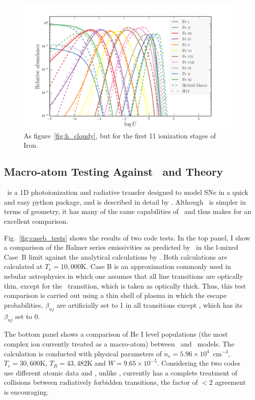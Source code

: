 \begin{figure}
\centering
\includegraphics[width=1.0\textwidth]{figures/03-radtrans/ir_comp.png}
\caption
{
As figure~\ref{fig:h_cloudy}, but for the first 11 ionization stages of Iron.
}
\label{fig:ir_cloudy}
\end{figure}

\subsection{Macro-atom Testing Against \tar\ and Theory}

\tar\ is a 1D photoionization and radiative transfer designed to
model SNe in a quick and easy python package, and is described in detail by
\cite{kerzendorfsim}. Although \tar\ is simpler in terms
of geometry, it has many of the same capabilities of \py\ and 
thus makes for an excellent comparison. 

Fig.~\ref{fig:caseb_tests} shows the results of two code tests. 
In the top panel, I show a comparison of the Balmer series 
emissivities as predicted by \py\ in the l-mixed Case~B limit against the
analytical calculations by \cite{seaton1959}. 
Both calculations are calculated at $T_e=10,000$K.
Case B is an approximation commonly used in nebular astrophysics 
\citep[see e.g.][]{osterbrock} in which
one assumes that all line transitions are optically thin, except
for the \la\ transition, which is taken as optically thick.
Thus, this test comparison is carried out using a thin shell
of plasma in which the escape probabilities, $\beta_{uj}$ 
are artificially set to 1 in all transitions except \la, which
has its $\beta_{uj}$ set to 0.

The bottom panel shows a comparison of He I level populations 
(the most complex ion currently 
treated as a macro-atom) between \py\ and \tar\ models.
The calculation is conducted with physical parameters of $n_e=5.96\times10^4$~cm$^{-3}$,
$T_e=30,600$K, $T_R=43,482$K and $W=9.65\times10^{-5}$. 
Considering the two codes use different atomic data and 
\tar, unlike \py, currently has a 
complete treatment of collisions between 
radiatively forbidden transitions, the factor of 
$<2$ agreement is encouraging. 

